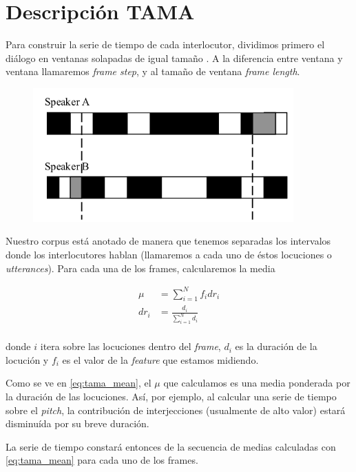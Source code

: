 \section{Descripción TAMA}

Para construir la serie de tiempo de cada interlocutor, dividimos primero el diálogo en ventanas solapadas de igual tamaño \cite{KOU2008}. A la diferencia entre ventana y ventana llamaremos \emph{frame step}, y al tamaño de ventana \emph{frame length}.

\begin{figure}
\centering
\includegraphics[width=10cm]{images/tama.png}

\end{figure}

Nuestro corpus está anotado de manera que tenemos separadas los intervalos donde los interlocutores hablan (llamaremos a cada uno de éstos locuciones o \emph{utterances}). Para cada una de los frames, calcularemos la media

\begin{align}
    \mu &= \sum\limits_{i=1}^N f_i dr_i \label{eq:tama_mean}\\
    dr_i &= \frac{d_i}{\sum\limits_{i=1}^N d_i} \\
\end{align}

donde $i$ itera sobre las locuciones dentro del \emph{frame}, $d_i$ es la duración de la locución y $f_i$ es el valor de la \emph{feature} que estamos midiendo.

Como se ve en \ref{eq:tama_mean}, el $\mu$ que calculamos es una media ponderada por la duración de las locuciones. Así, por ejemplo, al calcular una serie de tiempo sobre el \emph{pitch}, la contribución de interjecciones (usualmente de alto valor) estará disminuída por su breve duración.

La serie de tiempo constará entonces de la secuencia de medias calculadas con \ref{eq:tama_mean} para cada uno de los frames.


